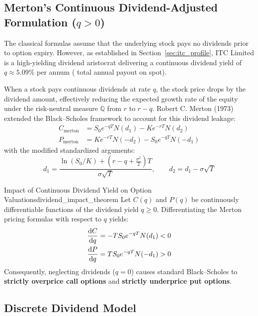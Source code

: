 \subsection{Merton's Continuous Dividend-Adjusted Formulation ($q > 0$)}

The classical formulas assume that the underlying stock pays no dividends prior to option expiry. However, as established in Section~\ref{sec:itc_profile}, ITC Limited is a high-yielding dividend aristocrat delivering a continuous dividend yield of $q \approx 5.09\%$ per annum ( total annual payout on  spot). 

When a stock pays continuous dividends at rate $q$, the stock price drops by the dividend amount, effectively reducing the expected growth rate of the equity under the risk-neutral measure $\mathbb{Q}$ from $r$ to $r - q$. Robert C. Merton (1973) extended the Black--Scholes framework to account for this dividend leakage:
\begin{align}
C_{\text{merton}} &= S_0 e^{-q T} N(d_1) - K e^{-r T} N(d_2) \label{eq:bs_merton_call} \\
P_{\text{merton}} &= K e^{-r T} N(-d_2) - S_0 e^{-q T} N(-d_1) \label{eq:bs_merton_put}
\end{align}
with the modified standardized arguments:
\begin{equation}
d_1 = \frac{\ln(S_0 / K) + \left(r - q + \frac{\sigma^2}{2}\right)T}{\sigma \sqrt{T}}, \qquad d_2 = d_1 - \sigma \sqrt{T}
\label{eq:d1_d2_merton}
\end{equation}

\begin{theorem}{Impact of Continuous Dividend Yield on Option Valuations}{dividend_impact_theorem}
Let $C(q)$ and $P(q)$ be continuously differentiable functions of the dividend yield $q \ge 0$. Differentiating the Merton pricing formulas with respect to $q$ yields:
\begin{align}
\frac{\mathrm{d} C}{\mathrm{d} q} &= -T S_0 e^{-q T} N(d_1) < 0 \\
\frac{\mathrm{d} P}{\mathrm{d} q} &= T S_0 e^{-q T} N(-d_1) > 0
\end{align}
Consequently, neglecting dividends ($q = 0$) causes standard Black--Scholes to \textbf{strictly overprice call options} and \textbf{strictly underprice put options}.
\end{theorem}

\subsection{Discrete Dividend Model}

